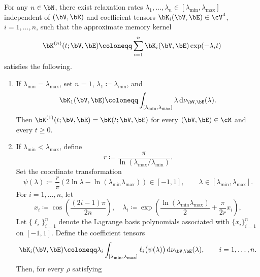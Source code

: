 \begin{lemma}
\label{lem:uniform_prony_discretization_beta}
For any $n\in\bN$, there exist relaxation rates $\lambda_1,\dots,\lambda_n\in[\lambda_{\min},\lambda_{\max}]$ independent of $(\bV,\bE)$ and coefficient tensors $\bK_i(\bV,\bE)\in\cV^4$, $i=1,\dots,n$, such that the approximate memory kernel
\begin{equation}\label{eq:Kn_def}
    \bK^{(n)}(t;\bV,\bE)\coloneqq\sum_{i=1}^n \bK_i(\bV,\bE)\exp(-\lambda_i t) 
\end{equation}
satisfies the following.
\begin{enumerate}[label=(\roman*)]
\item If $\lambda_{\min}=\lambda_{\max}$, set $n=1$, $\lambda_1\coloneqq \lambda_{\min}$, and
\begin{equation}\label{eq:Ki_def_degenerate}
\bK_1(\bV,\bE)\coloneqq \int_{[\lambda_{\min},\lambda_{\max}]} \lambda\,\mathrm{d}\nu_{\bV,\bE}(\lambda).
\end{equation}
Then $\bK^{(1)}(t;\bV,\bE)=\bK(t;\bV,\bE)$ for every $(\bV,\bE)\in\cM$ and every $t\ge 0$.
\item If $\lambda_{\min}<\lambda_{\max}$, define
\begin{equation}\label{eq:r_def}
    r \coloneqq \frac{\pi}{\ln(\lambda_{\max}/\lambda_{\min})}.
\end{equation}
Set the coordinate transformation
\begin{equation}\label{eq:log_spectral_coordinate}
\psi(\lambda)\coloneqq
\frac{r}{\pi}\left(2\ln \lambda-\ln (\lambda_{\min}\lambda_{\max})\right)
\in[-1,1],
\qquad \lambda\in[\lambda_{\min},\lambda_{\max}].
\end{equation}
For $i=1,\dots,n$, let
\begin{equation}\label{eq:chebyshev_nodes_log_spectrum}
x_i\coloneqq \cos\left(\frac{(2i-1)\pi}{2n}\right),
\quad
\lambda_i\coloneqq
\exp\left(
\frac{\ln(\lambda_{\min}\lambda_{\max})}{2}
+\frac{\pi}{2r}x_i
\right),
\end{equation}
Let $\{\ell_i\}_{i=1}^n$ denote the Lagrange basis polynomials associated with $\{x_i\}_{i=1}^n$ on $[-1,1]$.
Define the coefficient tensors
\begin{equation}\label{eq:Ki_def}
\bK_i(\bV,\bE)\coloneqq
\lambda_i
\int_{[\lambda_{\min},\lambda_{\max}]}
\ell_i\bigl(\psi(\lambda)\bigr)\,\mathrm{d}\nu_{\bV,\bE}(\lambda),
\qquad i=1,\dots,n.
\end{equation}
Then, for every $\rho$ satisfying
\begin{equation}\label{eq:ellipse_admissibility}

\end{equation}
\end{enumerate}
\end{lemma}
